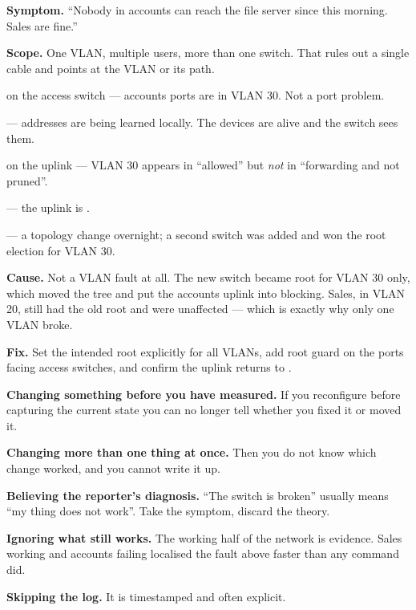 \begin{worked}
\textbf{Symptom.} ``Nobody in accounts can reach the file server since this
morning. Sales are fine.''

\textbf{Scope.} One VLAN, multiple users, more than one switch. That rules out a
single cable and points at the VLAN or its path.

\begin{tightnum}
  \item {} on the access switch --- accounts ports are
         in VLAN 30. Not a port problem.
  \item {} --- addresses are being learned
        locally. The devices are alive and the switch sees them.
  \item {} on the uplink --- VLAN 30 appears in
        ``allowed'' but \emph{not} in ``forwarding and not pruned''.
  \item {} --- the uplink is .
  \item {} --- a topology change overnight; a
        second switch was added and won the root election for VLAN 30.
\end{tightnum}

\textbf{Cause.} Not a VLAN fault at all. The new switch became root for VLAN 30
only, which moved the tree and put the accounts uplink into blocking. Sales, in
VLAN 20, still had the old root and were unaffected --- which is exactly why only
one VLAN broke.

\textbf{Fix.} Set the intended root explicitly for all VLANs, add root guard on
the ports facing access switches, and confirm the uplink returns to
.
\end{worked}

\begin{pitfall}
\begin{tight}
  \item \textbf{Changing something before you have measured.} If you reconfigure
        before capturing the current state you can no longer tell whether you
        fixed it or moved it.
  \item \textbf{Changing more than one thing at once.} Then you do not know which
        change worked, and you cannot write it up.
  \item \textbf{Believing the reporter's diagnosis.} ``The switch is broken''
        usually means ``my thing does not work''. Take the symptom, discard the
        theory.
  \item \textbf{Ignoring what still works.} The working half of the network is
        evidence. Sales working and accounts failing localised the fault above
        faster than any command did.
  \item \textbf{Skipping the log.} It is timestamped and often explicit.
\end{tight}
\end{pitfall}

